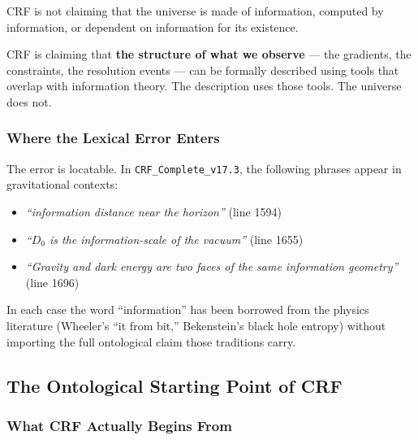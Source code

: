 \documentclass[12pt, a4paper]{article}
\begin{document}
\begin{keybox}[title={The misreading, stated precisely}]
CRF is not claiming that the universe is made of information,
computed by information, or dependent on information for its
existence.

CRF is claiming that \textbf{the structure of what we observe}
--- the gradients, the constraints, the resolution events ---
can be formally described using tools that overlap with
information theory. The description uses those tools.
The universe does not.
\end{keybox}

\subsubsection{Where the Lexical Error Enters}

The error is locatable. In \texttt{CRF\_Complete\_v17.3},
the following phrases appear in gravitational contexts:
\begin{itemize}[leftmargin=*]
\item \textit{``information distance near the horizon''} (line 1594)
\item \textit{``$D_0$ is the information-scale of the vacuum''}
  (line 1655)
\item \textit{``Gravity and dark energy are two faces of the same
  information geometry''} (line 1696)
\end{itemize}
In each case the word ``information'' has been borrowed from the
physics literature (Wheeler's ``it from bit,'' Bekenstein's black
hole entropy) without importing the full ontological claim those
traditions carry.

\subsection{The Ontological Starting Point of CRF}

\subsubsection{What CRF Actually Begins From}
\end{document}
